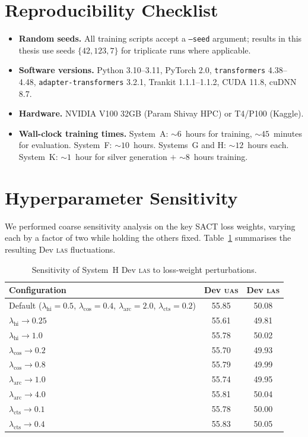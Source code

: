 \documentclass[12pt,a4paper,oneside]{report}
\newcommand{\uas}{\textsc{uas}}
\newcommand{\las}{\textsc{las}}
\begin{document}
\section{Reproducibility Checklist}

\begin{itemize}
  \item \textbf{Random seeds.} All training scripts accept a \texttt{--seed}
        argument; results in this thesis use seeds $\{42, 123, 7\}$ for
        triplicate runs where applicable.
  \item \textbf{Software versions.} Python 3.10--3.11, PyTorch 2.0,
        \texttt{transformers} 4.38--4.48, \texttt{adapter-transformers}
        3.2.1, Trankit 1.1.1--1.1.2, CUDA 11.8, cuDNN 8.7.
  \item \textbf{Hardware.} NVIDIA V100 32GB (Param Shivay HPC) or T4/P100
        (Kaggle).
  \item \textbf{Wall-clock training times.} System~A: ${\sim}6$~hours for
        training, ${\sim}45$~minutes for evaluation. System~F:
        ${\sim}10$~hours. Systems~G and H: ${\sim}12$~hours each. System~K:
        ${\sim}1$~hour for silver generation $+$ ${\sim}8$~hours training.
\end{itemize}

\section{Hyperparameter Sensitivity}

We performed coarse sensitivity analysis on the key SACT loss weights, varying
each by a factor of two while holding the others fixed.
Table~\ref{tab:sensitivity} summarises the resulting Dev \las{} fluctuations.

\begin{table}[ht]
\centering
\caption{Sensitivity of System~H Dev \las{} to loss-weight perturbations.}
\label{tab:sensitivity}
\begin{tabular}{@{}lcc@{}}
\toprule
\textbf{Configuration} & \textbf{Dev \uas{}} & \textbf{Dev \las{}} \\
\midrule
Default ($\lambda_{\text{hi}}{=}0.5$, $\lambda_{\text{cos}}{=}0.4$, $\lambda_{\text{arc}}{=}2.0$, $\lambda_{\text{cts}}{=}0.2$) & 55.85 & 50.08 \\
$\lambda_{\text{hi}} \to 0.25$  & 55.61 & 49.81 \\
$\lambda_{\text{hi}} \to 1.0$   & 55.78 & 50.02 \\
$\lambda_{\text{cos}} \to 0.2$  & 55.70 & 49.93 \\
$\lambda_{\text{cos}} \to 0.8$  & 55.79 & 49.99 \\
$\lambda_{\text{arc}} \to 1.0$  & 55.74 & 49.95 \\
$\lambda_{\text{arc}} \to 4.0$  & 55.81 & 50.04 \\
$\lambda_{\text{cts}} \to 0.1$  & 55.78 & 50.00 \\
$\lambda_{\text{cts}} \to 0.4$  & 55.83 & 50.05 \\
\bottomrule
\end{tabular}
\end{table}
\end{document}
